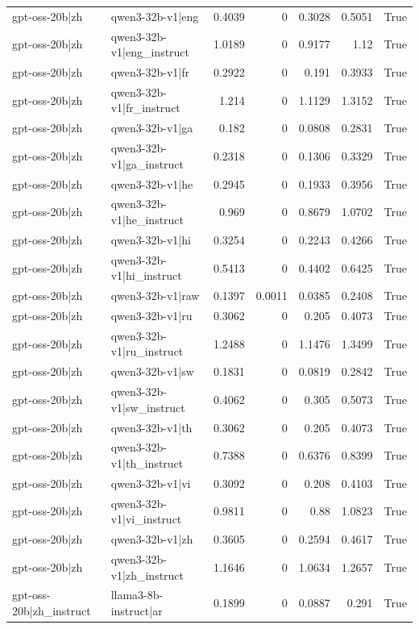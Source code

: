 \begin{table}
\begin{tabular}{l l r r r r l}
gpt-oss-20b|zh & qwen3-32b-v1|eng & 0.4039 & 0 & 0.3028 & 0.5051 & True \\
gpt-oss-20b|zh & qwen3-32b-v1|eng_instruct & 1.0189 & 0 & 0.9177 & 1.12 & True \\
gpt-oss-20b|zh & qwen3-32b-v1|fr & 0.2922 & 0 & 0.191 & 0.3933 & True \\
gpt-oss-20b|zh & qwen3-32b-v1|fr_instruct & 1.214 & 0 & 1.1129 & 1.3152 & True \\
gpt-oss-20b|zh & qwen3-32b-v1|ga & 0.182 & 0 & 0.0808 & 0.2831 & True \\
gpt-oss-20b|zh & qwen3-32b-v1|ga_instruct & 0.2318 & 0 & 0.1306 & 0.3329 & True \\
gpt-oss-20b|zh & qwen3-32b-v1|he & 0.2945 & 0 & 0.1933 & 0.3956 & True \\
gpt-oss-20b|zh & qwen3-32b-v1|he_instruct & 0.969 & 0 & 0.8679 & 1.0702 & True \\
gpt-oss-20b|zh & qwen3-32b-v1|hi & 0.3254 & 0 & 0.2243 & 0.4266 & True \\
gpt-oss-20b|zh & qwen3-32b-v1|hi_instruct & 0.5413 & 0 & 0.4402 & 0.6425 & True \\
gpt-oss-20b|zh & qwen3-32b-v1|raw & 0.1397 & 0.0011 & 0.0385 & 0.2408 & True \\
gpt-oss-20b|zh & qwen3-32b-v1|ru & 0.3062 & 0 & 0.205 & 0.4073 & True \\
gpt-oss-20b|zh & qwen3-32b-v1|ru_instruct & 1.2488 & 0 & 1.1476 & 1.3499 & True \\
gpt-oss-20b|zh & qwen3-32b-v1|sw & 0.1831 & 0 & 0.0819 & 0.2842 & True \\
gpt-oss-20b|zh & qwen3-32b-v1|sw_instruct & 0.4062 & 0 & 0.305 & 0.5073 & True \\
gpt-oss-20b|zh & qwen3-32b-v1|th & 0.3062 & 0 & 0.205 & 0.4073 & True \\
gpt-oss-20b|zh & qwen3-32b-v1|th_instruct & 0.7388 & 0 & 0.6376 & 0.8399 & True \\
gpt-oss-20b|zh & qwen3-32b-v1|vi & 0.3092 & 0 & 0.208 & 0.4103 & True \\
gpt-oss-20b|zh & qwen3-32b-v1|vi_instruct & 0.9811 & 0 & 0.88 & 1.0823 & True \\
gpt-oss-20b|zh & qwen3-32b-v1|zh & 0.3605 & 0 & 0.2594 & 0.4617 & True \\
gpt-oss-20b|zh & qwen3-32b-v1|zh_instruct & 1.1646 & 0 & 1.0634 & 1.2657 & True \\
gpt-oss-20b|zh_instruct & llama3-8b-instruct|ar & 0.1899 & 0 & 0.0887 & 0.291 & True \\

\end{tabular}
\end{table}
